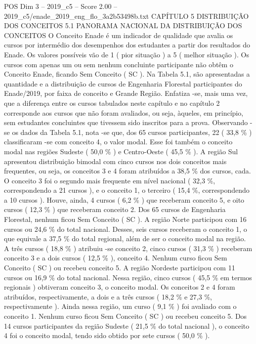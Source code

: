 \begin{textsample}{POS Dim 3 – 2019\_c5 – Score 2.00 – 2019\_c5/enade\_2019\_eng\_flo\_3a2b53498b.txt}  \label{ex:f3_pos_076}
CAPÍTULO 5 DISTRIBUIÇÃO DOS CONCEITOS 5.1 PANORAMA NACIONAL DA DISTRIBUIÇÃO DOS CONCEITOS O Conceito Enade é um indicador de qualidade que avalia os cursos por intermédio dos desempenhos dos estudantes a partir dos resultados do Enade.
Os valores possíveis vão de 1 ( pior situação ) a 5 ( melhor situação ).
Os cursos com apenas um ou sem nenhum concluinte participante não obtêm o Conceito Enade, ficando Sem Conceito ( SC ).
Na Tabela 5.1, são apresentadas a quantidade e a distribuição de cursos de Engenharia Florestal participantes do Enade/2019, por faixa de conceito e Grande Região.
Enfatiza -se, mais uma vez, que a diferença entre os cursos tabulados neste capítulo e no capítulo 2 corresponde aos cursos que não foram avaliados, ou seja, àqueles, em princípio, sem estudantes concluintes que tivessem sido inscritos para a prova.
Observando -se os dados da Tabela 5.1, nota -se que, dos 65 cursos participantes, 22 ( 33,8 \% ) classificaram -se com conceito 4, o valor modal.
Esse foi também o conceito modal nas regiões Sudeste ( 50,0 \% ) e Centro-Oeste ( 45,5 \% ).
A região Sul apresentou distribuição bimodal com cinco cursos nos dois conceitos mais frequentes, ou seja, os conceitos 3 e 4 foram atribuídos a 38,5 \% dos cursos, cada.
O conceito 3 foi o segundo mais frequente em nível nacional ( 32,3 \%, correspondendo a 21 cursos ), e o conceito 1, o terceiro ( 15,4 \%, correspondendo a 10 cursos ).
Houve, ainda, 4 cursos ( 6,2 \% ) que receberam conceito 5, e oito cursos ( 12,3 \% ) que receberam conceito 2.
Dos 65 cursos de Engenharia Florestal, nenhum ficou Sem Conceito ( SC ).
A região Norte participou com 16 cursos ou 24,6 \% do total nacional.
Desses, seis cursos receberam o conceito 1, o que equivale a 37,5 \% do total regional, além de ser o conceito modal na região.
A três cursos ( 18,8 \% ) atribuiu -se conceito 2, cinco cursos ( 31,3 \% ) receberam conceito 3 e a dois cursos ( 12,5 \% ), conceito 4.
Nenhum curso ficou Sem Conceito ( SC ) ou recebeu conceito 5.
A região Nordeste participou com 11 cursos ou 16,9 \% do total nacional.
Nessa região, cinco cursos ( 45,5 \% em termos regionais ) obtiveram conceito 3, o conceito modal.
Os conceitos 2 e 4 foram atribuídos, respectivamente, a dois e a três cursos ( 18,2 \% e 27,3 \%, respectivamente ).
Ainda nessa região, um curso ( 9,1 \% ) foi avaliado com o conceito 1.
Nenhum curso ficou Sem Conceito ( SC ) ou recebeu conceito 5.
Dos 14 cursos participantes da região Sudeste ( 21,5 \% do total nacional ), o conceito 4 foi o conceito modal, tendo sido obtido por sete cursos ( 50,0 \% ).

\end{textsample}
